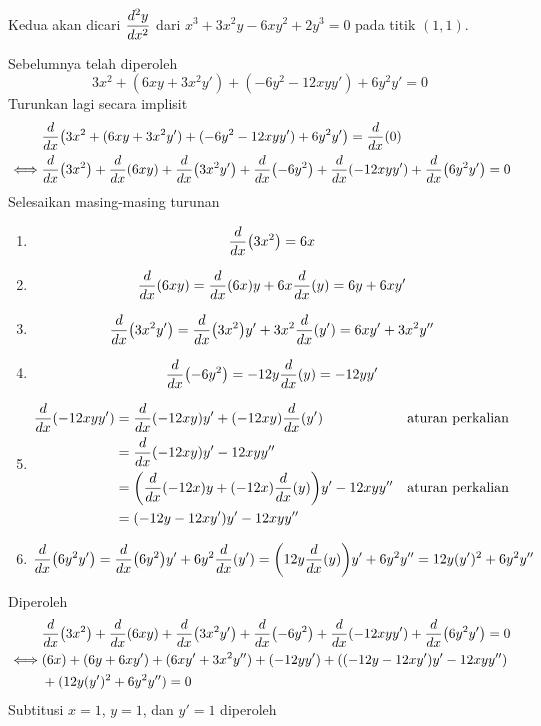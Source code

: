 \begin{enumerate}[leftmargin=*, label={\arabic*}.]
\begin{enumerate}[label={\alph*}.]
    Kedua akan dicari $\displaystyle\frac{d^{2}y}{dx^{2}}$ dari 
    $x^{3}+3x^{2}y-6xy^{2}+2y^{3}=0$ pada titik $(1,1)$.

    Sebelumnya telah diperoleh
    \[
        3x^{2}+(6xy+3x^{2}y')+(-6y^2-12xyy')+6y^{2}y'=0
    \]
    Turunkan lagi secara implisit
    \begin{align*}
        &\drv{x}{3x^{2}+(6xy+3x^{2}y')+(-6y^2-12xyy')+6y^{2}y'} = \drv{x}{0}\\
        \iff &\drv{x}{3x^{2}}+\drv{x}{6xy}+\drv{x}{3x^{2}y'}
        +\drv{x}{-6y^{2}}+\drv{x}{-12xyy'}+\drv{x}{6y^{2}y'}=0
    \end{align*}
    Selesaikan masing-masing turunan
        \begin{enumerate}[label={\arabic*})]
        \item \[
        \drv{x}{3x^{2}} = 6x
        \]
        \item \[
        \drv{x}{6xy} = \drv{x}{6x}y + 6x\drv{x}{y} = 6y+6xy'
        \]
        \item \[
        \drv{x}{3x^{2}y'} = \drv{x}{3x^{2}}y' + 3x^{2}\drv{x}{y'} = 6xy'+3x^{2}y''
        \]
        \item \[
        \drv{x}{-6y^{2}} = -12y\drv{x}{y} = -12yy'
        \]
        \item \begin{align*}
            \drv{x}{-12xyy'} &= \drv{x}{-12xy}y'+(-12xy)\drv{x}{y'}
            &\text{aturan perkalian}\\
            &=\drv{x}{-12xy}y'-12xyy''\\
            &=\brk*{\drv{x}{-12x}y+(-12x)\drv{x}{y}}y'-12xyy''
            &\text{aturan perkalian}\\
            &=(-12y-12xy')y'-12xyy''
        \end{align*}
        \item \[
            \drv{x}{6y^{2}y'} = \drv{x}{6y^{2}}y' + 6y^{2}\drv{x}{y'} 
            =\brk*{12y\drv{x}{y}}y'+6y^{2}y''=12y(y')^{2}+6y^{2}y''
        \]
        \end{enumerate}
    Diperoleh
    \begin{align*}
        &\drv{x}{3x^{2}}+\drv{x}{6xy}+\drv{x}{3x^{2}y'}
        +\drv{x}{-6y^{2}}+\drv{x}{-12xyy'}+\drv{x}{6y^{2}y'}=0\\
        \iff &(6x)+(6y+6xy')+(6xy'+3x^{2}y'')+(-12yy')
        +\brk*{(-12y-12xy')y'-12xyy''}\\
        &+(12y(y')^{2}+6y^{2}y'')=0
    \end{align*}
    Subtitusi $x=1$, $y=1$, dan $y'=1$ diperoleh

\end{enumerate}
\end{enumerate}
